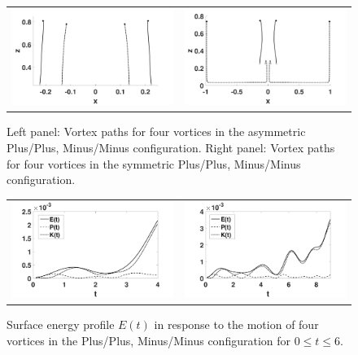 \documentclass[a4paper,11pt]{article}
\begin{document}
\begin{figure}[!h]
\centering
\begin{tabular}{cc}
\includegraphics[width=.5\textwidth]{tracks_F_pt2_tf_4_pmpm} & 
\includegraphics[width=.5\textwidth]{tracks_F_pt2_tf_9_pmpm_sym}
\end{tabular}
\caption{\small Left panel: Vortex paths for four vortices in the asymmetric Plus/Plus, Minus/Minus configuration.
Right panel: Vortex paths for four vortices in the symmetric Plus/Plus, Minus/Minus configuration.}
\label{fig:trackpmpm}
\end{figure}

\begin{figure}[!h]
\centering
\begin{tabular}{cc}
\includegraphics[width=.5\textwidth]{energy_profile_mu_pt2_F_pt2_pmpm} &
\includegraphics[width=.5\textwidth]{energy_profile_mu_pt2_F_pt2_pmpm_sym}
\end{tabular}
\caption{\small Surface energy profile $E(t)$ in response to the motion of four vortices in the Plus/Plus, Minus/Minus configuration for $0\leq t \leq 6$.}
\label{fig:eprof_pmpm}
\end{figure}
\end{document}

